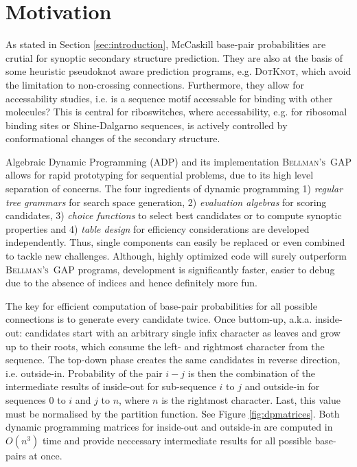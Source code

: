 \documentclass[paper=a4,fontsize=12pt]{scrartcl}
\newcommand{\progname}[1]{\mbox{\textsc{#1}}\xspace}
\def\dotknot{\progname{DotKnot}}
\def\bgap{\progname{Bellman's GAP}}
\begin{document}
\section{Motivation}
	As stated in Section \ref{sec:introduction}, McCaskill base-pair probabilities are crutial for synoptic secondary structure prediction. They are also at the basis of some heuristic pseudoknot aware prediction programs, e.g. \dotknot \cite{SPE:DAT:WIS:2011}, which avoid the limitation to non-crossing connections. Furthermore, they allow for accessability studies, i.e. is a sequence motif accessable for binding with other molecules? This is central for riboswitches, where accessability, e.g. for ribosomal binding sites or Shine-Dalgarno sequences, is actively controlled by conformational changes of the secondary structure.
	
	Algebraic Dynamic Programming (ADP) \cite{GIE:MEY:STE:2004} and its implementation \bgap \cite{SAU:MOEH:JAN:GIE:2013} allows for rapid prototyping for sequential problems, due to its high level separation of concerns. The four ingredients of dynamic programming 1) \emph{regular tree grammars} for search space generation, 2) \emph{evaluation algebras} for scoring candidates, 3) \emph{choice functions} to select best candidates or to compute synoptic properties and 4) \emph{table design} for efficiency considerations are developed independently. Thus, single components can easily be replaced or even combined to tackle new challenges. Although, highly optimized code will surely outperform \bgap programs, development is significantly faster, easier to debug due to the absence of indices and hence definitely more fun.
	
	The key for efficient computation of base-pair probabilities for all possible connections is to generate every candidate twice. Once buttom-up, a.k.a. inside-out: candidates start with an arbitrary single infix character as leaves and grow up to their roots, which consume the left- and rightmost character from the sequence. The top-down phase creates the same candidates in reverse direction, i.e. outside-in. Probability of the pair $i-j$ is then the combination of the intermediate results of inside-out for sub-sequence $i$ to $j$ and outside-in for sequences $0$ to $i$ and $j$ to $n$, where $n$ is the rightmost character. Last, this value must be normalised by the partition function. See Figure \ref{fig:dpmatrices}. Both dynamic programming matrices for inside-out and outside-in are computed in $O(n^3)$ time and provide neccessary intermediate results for all possible base-pairs at once.
	
\end{document}
